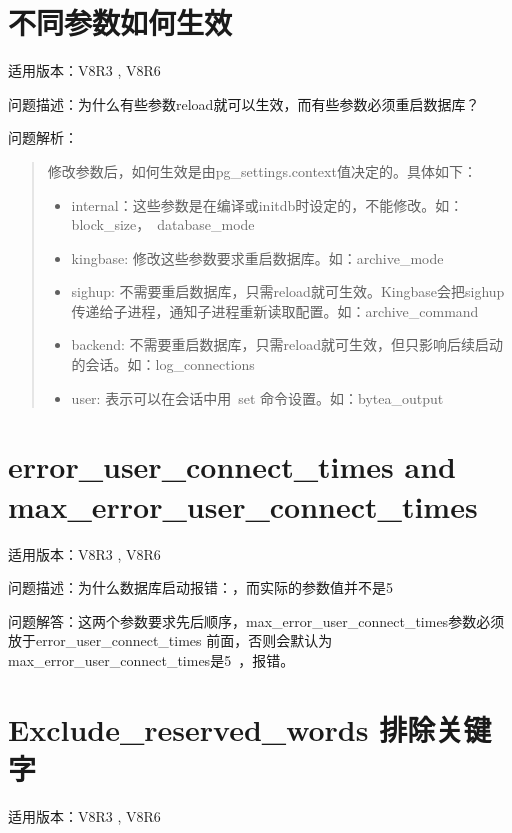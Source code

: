 \documentclass[a4,10pt,oneside,english]{sphinxmanual}
\begin{document}
\section{不同参数如何生效}
\label{\detokenize{parameter:id2}}
适用版本：V8R3 , V8R6

问题描述：为什么有些参数reload就可以生效，而有些参数必须重启数据库？

问题解析：
\begin{quote}

修改参数后，如何生效是由pg\_settings.context值决定的。具体如下：
\begin{itemize}
\item {} 
internal：这些参数是在编译或initdb时设定的，不能修改。如：block\_size， database\_mode

\item {} 
kingbase: 修改这些参数要求重启数据库。如：archive\_mode

\item {} 
sighup: 不需要重启数据库，只需reload就可生效。Kingbase会把sighup传递给子进程，通知子进程重新读取配置。如：archive\_command

\item {} 
backend: 不需要重启数据库，只需reload就可生效，但只影响后续启动的会话。如：log\_connections

\item {} 
user: 表示可以在会话中用 set 命令设置。如：bytea\_output

\end{itemize}
\end{quote}


\section{error\_user\_connect\_times and max\_error\_user\_connect\_times}
\label{\detokenize{parameter:error-user-connect-times-and-max-error-user-connect-times}}
适用版本：V8R3 , V8R6

问题描述：为什么数据库启动报错：，而实际的参数值并不是5

问题解答：这两个参数要求先后顺序，max\_error\_user\_connect\_times参数必须放于error\_user\_connect\_times
前面，否则会默认为max\_error\_user\_connect\_times是5 ，报错。


\section{Exclude\_reserved\_words 排除关键字}
\label{\detokenize{parameter:exclude-reserved-words}}
适用版本：V8R3 , V8R6
\end{document}
